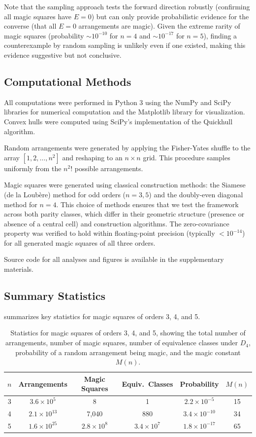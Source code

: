 Note that the sampling approach tests the forward direction robustly 
(confirming all magic squares have $E = 0$) but can only provide probabilistic evidence 
for the converse (that all $E = 0$ arrangements are magic).
Given the extreme rarity of magic squares (probability $\sim 10^{-10}$ for $n=4$ 
and $\sim 10^{-17}$ for $n=5$), finding a counterexample by random sampling is unlikely 
even if one existed, making this evidence suggestive but not conclusive.

\subsection{Computational Methods}

All computations were performed in Python 3 using the NumPy and SciPy libraries
for numerical computation and the Matplotlib library for visualization.
Convex hulls were computed using SciPy's implementation of the Quickhull algorithm.

Random arrangements were generated by applying the Fisher-Yates shuffle
to the array $[1, 2, \ldots, n^2]$ and reshaping to an $n \times n$ grid.
This procedure samples uniformly from the $n^2!$ possible arrangements.

Magic squares were generated using classical construction methods:
the Siamese (de la Loubère) method for odd orders ($n = 3, 5$)
and the doubly-even diagonal method for $n = 4$.
This choice of methods ensures that we test the framework across both parity classes,
which differ in their geometric structure (presence or absence of a central cell)
and construction algorithms.
The zero-covariance property was verified to hold within floating-point precision
(typically $< 10^{-14}$) for all generated magic squares of all three orders.

Source code for all analyses and figures is available in the supplementary materials.

\subsection{Summary Statistics}

 summarizes key statistics for magic squares of orders 3, 4, and 5.

\begin{table}[H]
\centering
\begin{tabular}{cccccc}
\toprule
$n$ & Arrangements & Magic Squares & Equiv.\ Classes & Probability & $M(n)$ \\
\midrule
3 & $3.6 \times 10^5$ & 8 & 1 & $2.2 \times 10^{-5}$ & 15 \\
4 & $2.1 \times 10^{13}$ & 7,040 & 880 & $3.4 \times 10^{-10}$ & 34 \\
5 & $1.6 \times 10^{25}$ & $2.8 \times 10^{8}$ & $3.4 \times 10^{7}$ & $1.8 \times 10^{-17}$ & 65 \\
\bottomrule
\end{tabular}
\caption{Statistics for magic squares of orders 3, 4, and 5,
showing the total number of arrangements, number of magic squares,
number of equivalence classes under $D_4$, probability of a random arrangement being magic,
and the magic constant $M(n)$.}
\label{tab:magic_stats}
\end{table}
